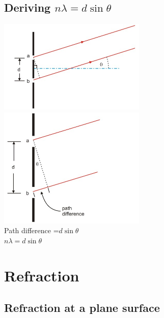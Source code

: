 \documentclass{article}[18pt]
\begin{document}
\subsection{Deriving $n\lambda=d\sin\theta$}
\includegraphics[width=7cm]{nlambda_1.png}\\
\includegraphics[width=7cm]{nlambda_2.png}\\
Path difference =$d\sin\theta$\\
$n\lambda=d\sin\theta$
\section{Refraction}
\subsection{Refraction at a plane surface}
\end{document}
